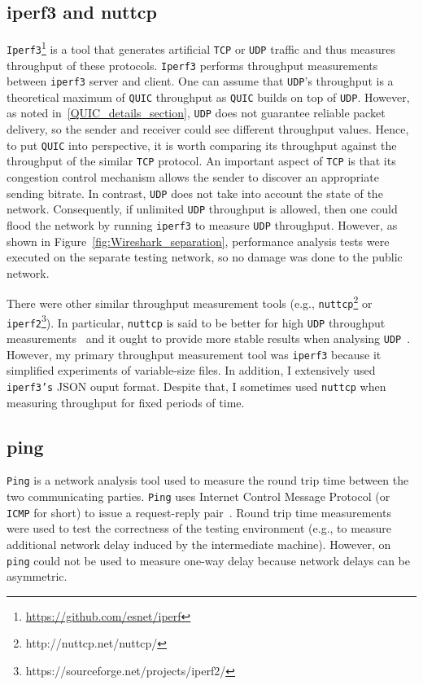 \documentclass[12pt,a4paper]{report}
\newcommand\note[2]{{\color{#1}\bf #2}}
\newcommand\simon[1]{\ifcomments{\note{cyan}{SM: #1}}\fi}
\begin{document}
\subsection{iperf3 and nuttcp}
\texttt{Iperf3}\footnote{\url{https://github.com/esnet/iperf}} is a tool that generates artificial \texttt{TCP} or \texttt{UDP} traffic and thus measures throughput of these protocols.
\texttt{Iperf3} performs throughput measurements between \texttt{iperf3} server and client.
One can assume that \texttt{UDP}'s throughput is a theoretical maximum of \texttt{QUIC} throughput as \texttt{QUIC} builds on top of \texttt{UDP}.
However, as noted in~\ref{QUIC_details_section}, \texttt{UDP} does not guarantee reliable packet delivery, so the sender and receiver could see different throughput values.
Hence, to put \texttt{QUIC} into perspective, it is worth comparing its throughput against the throughput of the similar \texttt{TCP} protocol.
An important aspect of \texttt{TCP} is that its congestion control mechanism allows the sender to discover an appropriate sending bitrate.
In contrast, \texttt{UDP} does not take into account the state of the network.
Consequently, if unlimited \texttt{UDP} throughput is allowed, then one could flood the network by running \texttt{iperf3} to measure \texttt{UDP} throughput.
However, as shown in Figure~\ref{fig:Wireshark_separation}, performance analysis tests were executed on the separate testing network, so no damage was done to the public network.

There were other similar throughput measurement tools (e.g., \texttt{nuttcp}\footnote{http://nuttcp.net/nuttcp/} or \texttt{iperf2}\footnote{https://sourceforge.net/projects/iperf2/}).
In particular, \texttt{nuttcp} is said to be better for high \texttt{UDP} throughput measurements~\cite{network-troubleshooting-tools_nuttcp} and it ought to provide more stable results when analysing \texttt{UDP}~\cite{Nuttcp_geant}.
However, my primary throughput measurement tool was \texttt{iperf3} because it simplified experiments of variable-size files.
In addition, I extensively used \texttt{iperf3's} JSON ouput format.
Despite that, I sometimes used \texttt{nuttcp} when measuring throughput for fixed periods of time. 



\subsection{ping}
\texttt{Ping} is a network analysis tool used to measure the round trip time between the two communicating parties.
\texttt{Ping} uses Internet Control Message Protocol (or \texttt{ICMP} for short) to issue a request-reply pair~\cite{internet-control-message-protocol-icmp}.
Round trip time measurements were used to test the correctness of the testing environment (e.g., to measure additional network delay induced by the intermediate machine).
However, on \texttt{ping} could not be used to measure one-way delay because network delays can be asymmetric.
\end{document}
